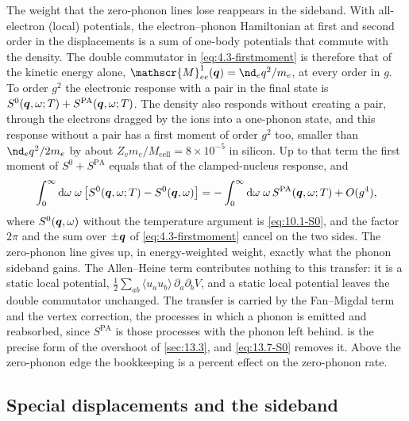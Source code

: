 The weight that the zero-phonon lines lose reappears in the sideband. With all-electron (local) potentials, the electron--phonon Hamiltonian at first and second order in the displacements is a sum of one-body potentials that commute with the density. The double commutator in \cref{eq:4.3-firstmoment} is therefore that of the kinetic energy alone, $\mathscr{M}^1_{ee}(\vect{q}) = \nd_eq^2/m_e$, at every order in $g$. To order $g^2$ the electronic response with a pair in the final state is $S^0(\bm{q},\omega;T) + S^{\mathrm{PA}}(\bm{q},\omega;T)$. The density also responds without creating a pair, through the electrons dragged by the ions into a one-phonon state, and this response without a pair has a first moment of order $g^2$ too, smaller than $\nd_eq^2/2m_e$ by about $Z_vm_e/M_{\mathrm{cell}} = 8\times10^{-5}$ in silicon. Up to that term the first moment of $S^0 + S^{\mathrm{PA}}$ equals that of the clamped-nucleus response, and
\begin{equation}
  \int_0^\infty\mathrm{d}\omega\;\omega\,\bigl[S^0(\bm{q},\omega;T) - S^0(\bm{q},\omega)\bigr]
  = -\int_0^\infty\mathrm{d}\omega\;\omega\,S^{\mathrm{PA}}(\bm{q},\omega;T) + O(g^4) ,
  \label{eq:13.7-fsum}
\end{equation}
where $S^0(\bm{q},\omega)$ without the temperature argument is \cref{eq:10.1-S0}, and the factor $2\pi$ and the sum over $\pm\bm{q}$ of \cref{eq:4.3-firstmoment} cancel on the two sides. The zero-phonon line gives up, in energy-weighted weight, exactly what the phonon sideband gains. The Allen--Heine term contributes nothing to this transfer: it is a static local potential, $\frac12\sum_{ab}\langle u_au_b\rangle\,\partial_a\partial_bV$, and a static local potential leaves the double commutator unchanged. The transfer is carried by the Fan--Migdal term and the vertex correction, the processes in which a phonon is emitted and reabsorbed, since $S^{\mathrm{PA}}$ is those processes with the phonon left behind.  is the precise form of the overshoot of \cref{sec:13.3}, and \cref{eq:13.7-S0} removes it. Above the zero-phonon edge the bookkeeping is a percent effect on the zero-phonon rate.

\subsection{Special displacements and the sideband}

